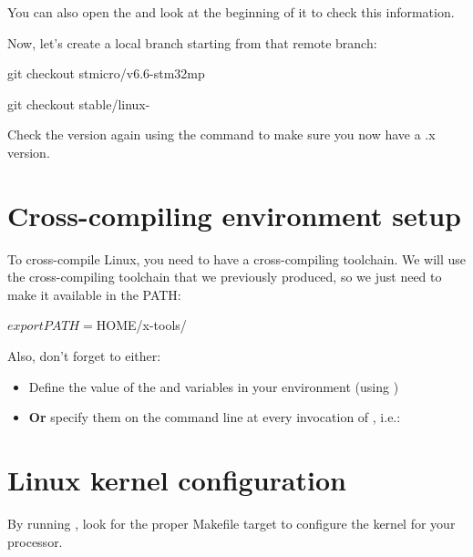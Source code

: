 You can also open the  and look at the beginning of it
to check this information.

Now, let's create a local branch starting from that remote branch:
\if{}
\begin{bashinput}
git checkout stmicro/v6.6-stm32mp
\end{bashinput}
\else
\begin{bashinput}
git checkout stable/linux-%
\end{bashinput}
\fi

Check the version again using the  command
to make sure you now have a \workingkernel.x version.

\section{Cross-compiling environment setup}

To cross-compile Linux, you need to have a cross-compiling
toolchain. We will use the cross-compiling toolchain that we
previously produced, so we just need to make it available in the PATH:

\begin{bashinput}
$ export PATH=$HOME/x-tools/%
\end{bashinput}

Also, don't forget to either:

\begin{itemize}
\item Define the value of the  and 
  variables in your environment (using )
\item {\bf Or} specify them on the command line at every invocation of
  , i.e.: 
\end{itemize}
\section{Linux kernel configuration}

By running , look for the proper Makefile target to
configure the kernel for your processor.


